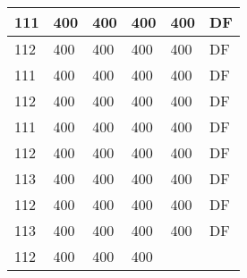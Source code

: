 \begin{table}[]
\begin{tabular}{lllll|l|}
111                                 & 400                                & 400                                & 400                                & 
400                                & DF                                    \\ \hline
112                                 & 400                                & 400                                & 400                                & 
400                                & DF                                    \\ \hline
111                                 & 400                                & 400                                & 400                                & 
400                                & DF                                    \\ \hline
112                                 & 400                                & 400                                & 400                                & 
400                                & DF                                    \\ \hline
111                                 & 400                                & 400                                & 400                                & 
400                                & DF                                    \\ \hline
112                                 & 400                                & 400                                & 400                                & 
400                                & DF                                    \\ \hline
113                                 & 400                                & 400                                & 400                                & 
400                                & DF                                    \\ \hline
112                                 & 400                                & 400                                & 400                                & 
400                                & DF                                    \\ \hline
113                                 & 400                                & 400                                & 400                                & 
400                                & DF                                    \\ \hline
112                                 & 400                                & 400                                & 400                                & 

\end{tabular}
\end{table}
